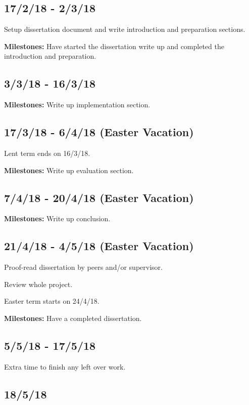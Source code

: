 \documentclass[12pt, a4]{article}
\begin{document}
\subsection*{17/2/18 - 2/3/18}

Setup dissertation document and write introduction and preparation sections.

{\bf Milestones:} Have started the dissertation write up and completed the introduction and preparation.

\subsection*{3/3/18 - 16/3/18}

{\bf Milestones:} Write up implementation section.

\subsection*{17/3/18 - 6/4/18 (Easter Vacation)}

Lent term ends on 16/3/18.

{\bf Milestones:} Write up evaluation section.

\subsection*{7/4/18 - 20/4/18 (Easter Vacation)}

{\bf Milestones:} Write up conclusion.

\subsection*{21/4/18 - 4/5/18 (Easter Vacation)}

Proof-read dissertation by peers and/or supervisor.

Review whole project.

Easter term starts on 24/4/18.

{\bf Milestones:} Have a completed dissertation.

\subsection*{5/5/18 - 17/5/18}

Extra time to finish any left over work.

\subsection*{18/5/18}
\end{document}
